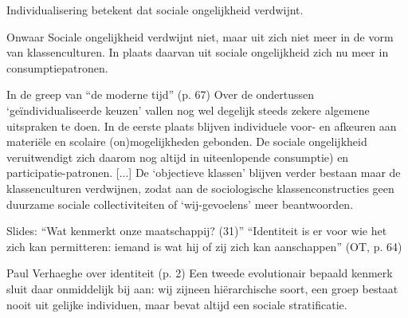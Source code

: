\documentclass[main.tex]{subfiles}
\begin{document}
\begin{examenvraag}
    \begin{stelling}
        Individualisering betekent dat sociale ongelijkheid verdwijnt.
    \end{stelling}

    \begin{stelling-antwoord}{Onwaar}
        Sociale ongelijkheid verdwijnt niet, maar uit zich niet meer in de vorm van klassenculturen.
        In plaats daarvan uit sociale ongelijkheid zich nu meer in consumptiepatronen.
        \begin{citaat}{In de greep van ``de moderne tijd'' (p. 67)}
            Over de ondertussen `ge\"individualiseerde keuzen' vallen nog wel degelijk steeds zekere algemene uitspraken te doen.
            In de eerste plaats blijven individuele voor- en afkeuren aan materi\"ele en scolaire (on)mogelijkheden gebonden.
            De sociale ongelijkheid veruitwendigt zich daarom nog altijd in uiteenlopende consumptie) en participatie-patronen.
            [...]
            De `objectieve klassen' blijven verder bestaan maar de klassenculturen 
            verdwijnen, zodat aan de sociologische klassenconstructies geen duurzame sociale collectiviteiten of `wij-gevoelens' meer beantwoorden.
        \end{citaat}
        \begin{citaat}{Slides: ``Wat kenmerkt onze maatschappij? (31)''}
            ``Identiteit is er voor wie het zich kan permitteren: iemand is wat hij of zij zich kan aanschappen'' (OT, p. 64)
        \end{citaat}
        \begin{citaat}{Paul Verhaeghe over identiteit (p. 2)}
            Een tweede evolutionair bepaald kenmerk sluit daar onmiddelijk bij aan: wij zijneen hi\"erarchische soort, een groep bestaat nooit uit gelijke individuen, maar bevat altijd een sociale stratificatie.
        \end{citaat}
    \end{stelling-antwoord}
\end{examenvraag}
\end{document}
